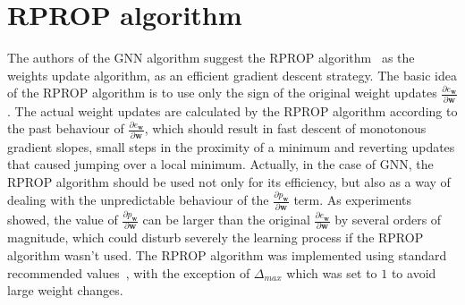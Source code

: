 \newpage
\section{RPROP algorithm}
The authors of the GNN algorithm suggest the RPROP algorithm~\cite{riedmiller1993direct} as the weights update algorithm, as an efficient gradient descent strategy. The basic idea of the RPROP algorithm is to use only the sign of the original weight updates $\frac{\partial e_{\bm{w}}}{\partial \bm{w}}$. The actual weight updates are calculated by the RPROP algorithm according to the past behaviour of $\frac{\partial e_{\bm{w}}}{\partial \bm{w}}$, which should result in fast descent of monotonous gradient slopes, small steps in the proximity of a minimum and reverting updates that caused jumping over a local minimum. Actually, in the case of GNN, the RPROP algorithm should be used not only for its efficiency, but also as a way of dealing with the unpredictable behaviour of the $\frac{\partial p_{\bm{w}}}{\partial \bm{w}}$ term. As experiments showed, the value of $\frac{\partial p_{\bm{w}}}{\partial \bm{w}}$ can be larger than the original $\frac{\partial e_{\bm{w}}}{\partial \bm{w}}$ by several orders of magnitude, which could disturb severely the learning process if the RPROP algorithm wasn't used. The RPROP algorithm was implemented using standard recommended values~\cite{riedmiller1993direct}, with the exception of $\Delta_{max}$ which was set to $1$ to avoid large weight changes.


